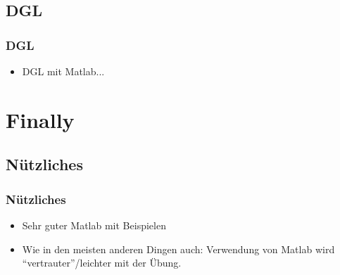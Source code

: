   \subsection{DGL}
  \begin{frame}
      \frametitle{DGL}
      \begin{itemize}
        \item DGL mit Matlab...
      \end{itemize}
  \end{frame}


  \section{Finally}

  \subsection{Nützliches}
  \begin{frame}
      \frametitle{Nützliches}
      \begin{itemize}
          \item Sehr guter Matlab  mit Beispielen
          \item Wie in den meisten anderen Dingen auch: Verwendung von Matlab wird ``vertrauter''/leichter mit der Übung.
      \end{itemize}
  \end{frame}




